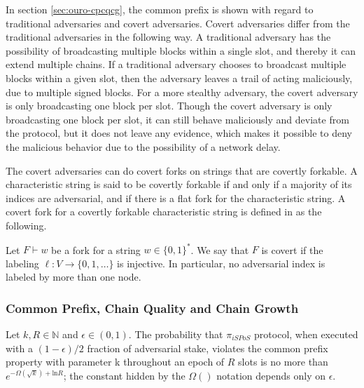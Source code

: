 In section \ref{sec:ouro-cpcqcg}, the common prefix is shown with regard to traditional adversaries and covert adversaries. Covert adversaries differ from the traditional adversaries in the following way. A traditional adversary has the possibility of broadcasting multiple blocks within a single slot, and thereby it can extend multiple chains. If a traditional adversary chooses to broadcast multiple blocks within a given slot, then the adversary leaves a trail of acting maliciously, due to multiple signed blocks. For a more stealthy adversary, the covert adversary is only broadcasting one block per slot. Though the covert adversary is only broadcasting one block per slot, it can still behave maliciously and deviate from the protocol, but it does not leave any evidence, which makes it possible to deny the malicious behavior due to the possibility of a network delay.

The covert adversaries can do covert forks on strings that are covertly forkable. A characteristic string is said to be covertly forkable if and only if a majority of its indices are adversarial, and if there is a flat fork for the characteristic string. A covert fork for a covertly forkable characteristic string is defined in \cite{ouroboros} as the following.

\begin{mydef}
Let $F \vdash w$ be a fork for a string $w\in \{0,1\}^{*}$. We say that $F$ is covert if the labeling $\ell : V \xrightarrow{} \{0,1,\ldots\}$ is injective. In particular, no adversarial index is labeled by more than one node.
\end{mydef}


\subsubsection*{Common Prefix, Chain Quality and Chain Growth}
\label{sec:ouro-cpcqcg}


\begin{theorem}
\label{th:common-prefix}
    Let $k,R \in \mathbb{N}$ and $\epsilon \in (0,1)$. The probability that $\pi_{iSPoS}$ protocol, when executed with a $(1-\epsilon)/2$ fraction of adversarial stake, violates the common prefix property with parameter k throughout an epoch of $R$ slots is no more than $e^{-\Omega(\sqrt{k})+\text{ln} R}$; the constant hidden by the $\Omega()$ notation depends only on $\epsilon$.
\end{theorem} 


